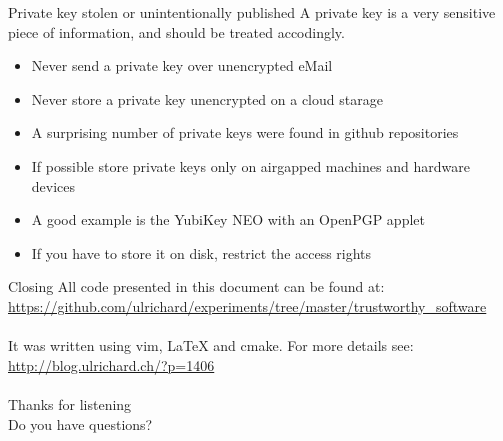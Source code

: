 \documentclass[11pt]{beamer}
\begin{document}
\begin{frame}{Private key stolen or unintentionally published}
A private key is a very sensitive piece of information, and should be treated accodingly.
\\[0.2cm]
\begin{itemize}
\item Never send a private key over unencrypted eMail %
\item Never store a private key unencrypted on a cloud starage
\item A surprising number of private keys were found in github repositories
\item If possible store private keys only on airgapped machines and hardware devices
\item A good example is the YubiKey NEO with an OpenPGP applet
\item If you have to store it on disk, restrict the access rights
\end{itemize}
\end{frame}

\begin{frame}{Closing}
All code presented in this document can be found at:\\
\href{https://github.com/ulrichard/experiments/tree/master/trustworthy\textunderscoresoftware}{https://github.com/ulrichard/experiments/tree/master/trustworthy\_software}\\
\\[0.5cm]
It was written using vim, LaTeX and cmake. For more details see:\\
\href{http://blog.ulrichard.ch/?p=1406}{http://blog.ulrichard.ch/?p=1406}\\
\\[0.5cm]
Thanks for listening
\\[0.5cm]
Do you have questions?
\end{frame}
\end{document}
